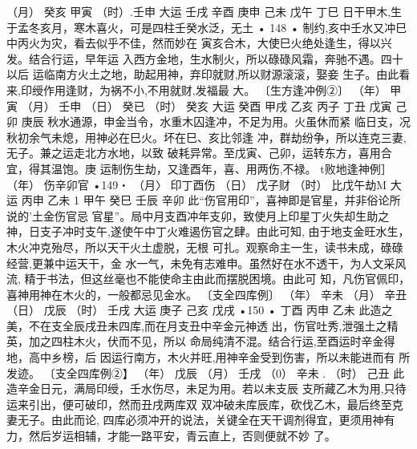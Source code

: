 （月） 癸亥
甲寅
（时）.壬申
大运 壬戌
辛酉
庚申
己未
戊午
丁巳
日干甲木,生于孟冬亥月，寒木喜火，可是四柱壬癸水泛，无土
• 148 •
制约,亥中壬水又冲巳中丙火为灾，看去似乎不佳，然而妙在
寅亥合木，大使巳火绝处逢生，得以兴发。结合行运，早年运
入西方金地，生水制火，所以碌碌风霜，奔驰不遇。四十以后
运临南方火土之地，助起用神，弃印就财,所以财源滚滚，娶妾
生子。由此看来,印绶作用逢财，为祸不小,不用就财,发福最
大。
〔生方逢冲例②〕
（年） 甲寅
（月） 壬申
（日） 癸已
（时） 癸亥
大运 癸酉
甲戌
乙亥
丙子
丁丑
戊寅
己卯
庚辰
秋水通源，申金当令，水重木囚逢冲，不足为用。火虽休而紧
临日支，况秋初余气未熄，用神必在巳火。坏在巳、亥比邻逢
冲，群劫纷争，所以连克三妻,无子。兼之运走北方水地，以致
破耗异常。至戊寅、己卯，运转东方，喜用合宜，得其温饱。庚
运制伤生劫，又逢酉年，喜、用两伤,不禄。
t败地逢神例］
（年） 伤辛卯官
•149・
（月〉 印丁酉伤
（日） 戊子财
（时） 比戊午劫M
大运 丙申
乙未
1 甲午
癸巳
壬辰
辛卯
此“伤官用印”，喜神即是官星，并非俗论所说的'土金伤官忌
官星”。局中月支酉冲年支卯，致使月上印星丁火失却生助之
神，日支子冲时支午,遂使午中丁火难遏伤官之肆。由此可知,
由于地支金旺水生，木火冲克殆尽，所以天干火土虚脱，无根
可扎。观察命主一生，读书未成，碌碌经营,更兼中运天干，金
水一气，未免有志难申。虽然好在水不透干，为人文采风流,
精于书法，但这丝毫也不能使命主由此而摆脱困境。由此可
知，凡伤官佩印，喜神用神在木火的，一般都忌见金水。
〔支全四库例〕
（年） 辛未
（月） 辛丑
（日） 戊辰
（时） 壬戌
大运 庚子
己亥
戊戌
•150 •
丁酉
丙申
乙未
此造之美，不在支全辰戌丑未四库,而在月支丑中辛金元神透
出，伤官吐秀,泄强土之精英，加之四柱木火，伏而不见，所以
命局纯清不混。结合行运,至酉运时辛金得地，高中乡榜，后
因运行南方，木火并旺,用神辛金受到伤害，所以未能进而有
所发迹。
〔支全四库例②】
（年） 戊辰
（月） 壬戌
（0） 辛未 .
（时） 己丑
此造辛金日元，满局印绶，壬水伤尽，未足为用。若以未支辰
支所藏乙木为用,只待运来引出，便可破印，然而丑戌两库双
双冲破未库辰库，砍伐乙木，最后终至克妻无子。由此而论,
四库必须冲开的说法，关键全在天干调剂得宜，更须用神有
力，然后岁运相辅，才能一路平安，青云直上，否则便就不妙
了。 

